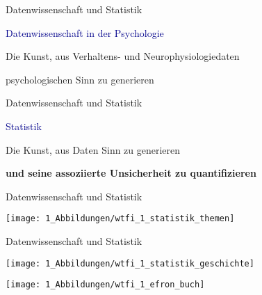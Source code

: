 \documentclass[
  8pt,
  ignorenonframetext,
]{beamer}
\begin{document}
\begin{frame}{Datenwissenschaft und Statistik}
\protect\hypertarget{datenwissenschaft-und-statistik-6}{}
\vfill

\center
\huge

\textcolor{darkblue}{Datenwissenschaft in der Psychologie} \vspace{5mm}

\Large

Die Kunst, aus Verhaltens- und Neurophysiologiedaten

psychologischen Sinn zu generieren
\end{frame}

\begin{frame}{Datenwissenschaft und Statistik}
\protect\hypertarget{datenwissenschaft-und-statistik-7}{}
\center
\huge

\textcolor{darkblue}{Statistik} \vspace{5mm}

\Large

Die Kunst, aus Daten Sinn zu generieren

\textbf{und seine assoziierte Unsicherheit zu quantifizieren}
\end{frame}

\begin{frame}{Datenwissenschaft und Statistik}
\protect\hypertarget{datenwissenschaft-und-statistik-8}{}
\begin{center}\texttt{[image: 1\_Abbildungen/wtfi\_1\_statistik\_themen]} \end{center}
\end{frame}

\begin{frame}{Datenwissenschaft und Statistik}
\protect\hypertarget{datenwissenschaft-und-statistik-9}{}
\vspace{.5cm}

\begin{minipage}{.6\linewidth}
\center

\begin{center}\texttt{[image: 1\_Abbildungen/wtfi\_1\_statistik\_geschichte]} \end{center}

\end{minipage}
\hspace{.5cm}
\begin{minipage}{.1\linewidth}
\center

\begin{center}\texttt{[image: 1\_Abbildungen/wtfi\_1\_efron\_buch]} \end{center}

\end{minipage}
\end{frame}
\end{document}
